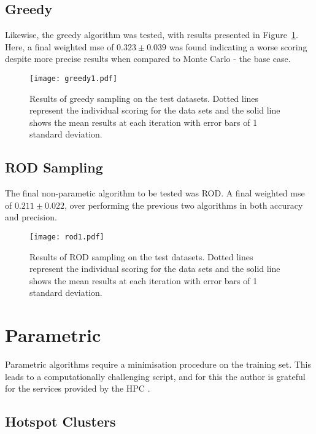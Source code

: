 \subsection{Greedy}
Likewise, the greedy algorithm was tested, with results presented in Figure~\ref{fig:GreedyTestSet}. Here, a final weighted mse of ${0.323\pm{}0.039}$ was found indicating a worse scoring despite more precise results when compared to Monte Carlo - the base case.
\begin{figure}[h]
    \begin{center}
        \texttt{[image: greedy1.pdf]}
        \caption[Greedy]{Results of greedy sampling on the test datasets. Dotted lines represent the individual scoring for the data sets and the solid line shows the mean results at each iteration with error bars of 1 standard deviation.}
        \label{fig:GreedyTestSet}
    \end{center}
\end{figure}

\subsection{ROD Sampling}
The final non-parametic algorithm to be tested was ROD. A final weighted mse of ${0.211\pm{}0.022}$, over performing the previous two algorithms in both accuracy and precision.

\begin{figure}[H]
    \begin{center}
        \texttt{[image: rod1.pdf]}
        \caption[ROD]{Results of ROD sampling on the test datasets. Dotted lines represent the individual scoring for the data sets and the solid line shows the mean results at each iteration with error bars of 1 standard deviation.}
        \label{fig:RODTestSet}
    \end{center}
\end{figure}

\section{Parametric}
Parametric algorithms require a minimisation procedure on the training set. This leads to a computationally challenging script, and for this the author is grateful for the services provided by the HPC \cite{HPC}.
\subsection{Hotspot Clusters}


